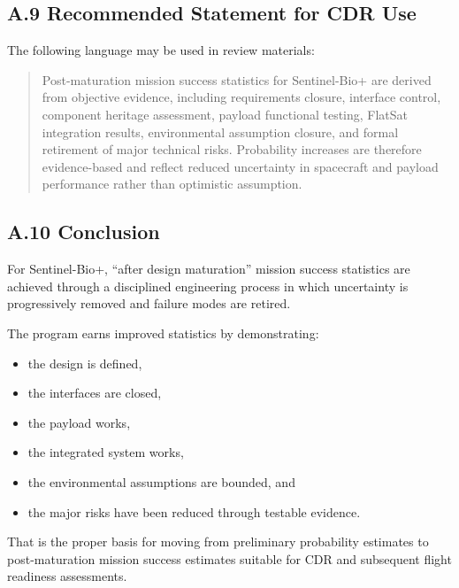 \documentclass[11pt]{article}
\begin{document}
\subsection*{A.9 Recommended Statement for CDR Use}

The following language may be used in review materials:

\begin{quote}
Post-maturation mission success statistics for Sentinel-Bio+ are derived from objective evidence,
including requirements closure, interface control, component heritage assessment, payload functional
testing, FlatSat integration results, environmental assumption closure, and formal retirement of major
technical risks. Probability increases are therefore evidence-based and reflect reduced uncertainty in
spacecraft and payload performance rather than optimistic assumption.
\end{quote}

\subsection*{A.10 Conclusion}

For Sentinel-Bio+, ``after design maturation'' mission success statistics are achieved through a disciplined
engineering process in which uncertainty is progressively removed and failure modes are retired.

The program earns improved statistics by demonstrating:

\begin{itemize}
    \item the design is defined,
    \item the interfaces are closed,
    \item the payload works,
    \item the integrated system works,
    \item the environmental assumptions are bounded, and
    \item the major risks have been reduced through testable evidence.
\end{itemize}

That is the proper basis for moving from preliminary probability estimates to post-maturation mission
success estimates suitable for CDR and subsequent flight readiness assessments.
\end{document}
